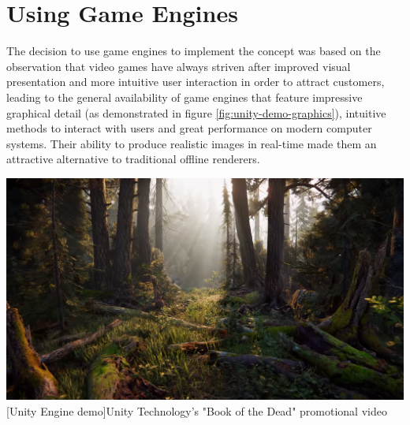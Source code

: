 \section{Using Game Engines}
The decision to use game engines to implement the concept was based on the observation that video games have always striven after improved visual presentation and more intuitive user interaction in order to attract customers, leading to the general availability of game engines that feature impressive graphical detail (as demonstrated in figure \ref{fig:unity-demo-graphics}), intuitive methods to interact with users and great performance on modern computer systems. Their ability to produce realistic images in real-time made them an attractive alternative to traditional offline renderers.
\begin{center}
\noindent\includegraphics[width=14cm]{tex/img/ch05/UnityGraphicsDemo.png}
[Unity Engine demo]{Unity Technology's "Book of the Dead" promotional video \cite{UnityDemoRealtimeTeaser}}
\label{fig:unity-demo-graphics}
\end{center}

